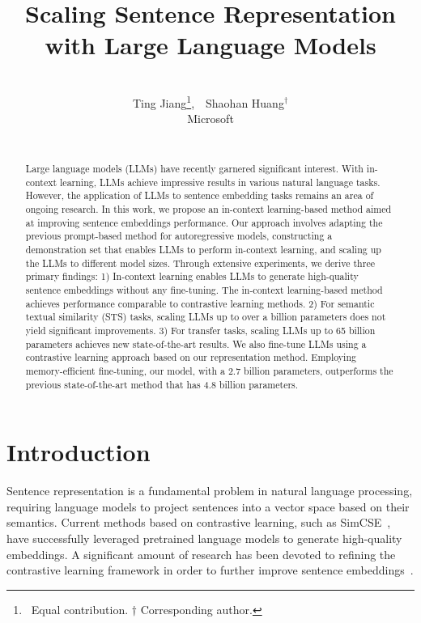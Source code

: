 \documentclass{article}
\title{Scaling Sentence Representation \\ with Large Language Models}
\author{
\vspace{-0.25in} \\
Ting Jiang\thanks{~Equal contribution. $\dagger$ Corresponding author.},~~{Shaohan Huang}$^\dagger$ \\
Microsoft \\
\vspace{-0.4cm}
\\}
\date{}
\begin{document}
\maketitle


\begin{abstract}
Large language models (LLMs) have recently garnered significant interest. With in-context learning, LLMs achieve impressive results in various natural language tasks. However, the application of LLMs to sentence embedding tasks remains an area of ongoing research. In this work, we propose an in-context learning-based method aimed at improving sentence embeddings performance. 
Our approach involves adapting the previous prompt-based method for autoregressive models, constructing a demonstration set that enables LLMs to perform in-context learning, and scaling up the LLMs to different model sizes.
Through extensive experiments, we derive three primary findings: 1) In-context learning enables LLMs to generate high-quality sentence embeddings without any fine-tuning. The in-context learning-based method achieves performance comparable to contrastive learning methods. 2) For semantic textual similarity (STS) tasks, scaling LLMs up to over a billion parameters does not yield significant improvements. 3) For transfer tasks, scaling LLMs up to 65 billion parameters achieves new state-of-the-art results.
We also fine-tune LLMs using a contrastive learning approach based on our representation method. Employing memory-efficient fine-tuning, our model, with a 2.7 billion parameters, outperforms the previous state-of-the-art method that has 4.8 billion parameters.

\end{abstract}

\section{Introduction}
\label{sec:intro}

Sentence representation is a fundamental problem in natural language processing, requiring language models to project sentences into a vector space based on their semantics. Current methods based on contrastive learning, such as SimCSE~\cite{gao2021simcse}, have successfully leveraged pretrained language models to generate high-quality embeddings. A significant amount of research has been devoted to refining the contrastive learning framework in order to further improve sentence embeddings~\cite{chuang2022diffcse, wu2022pcl, wu-etal-2022-infocse, cheng2023improving}.
\end{document}
